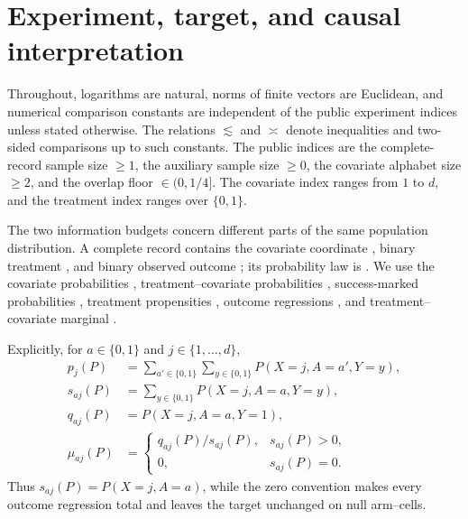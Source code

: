 \documentclass[11pt]{article}
\begin{document}
\section{Experiment, target, and causal interpretation}

Throughout, logarithms are natural, norms of finite vectors are Euclidean, and numerical comparison constants are independent of the public experiment indices unless stated otherwise. The relations \(\lesssim\) and \(\asymp\) denote inequalities and two-sided comparisons up to such constants. The public indices are the complete-record sample size \(\ge1\), the auxiliary sample size \(\ge0\), the covariate alphabet size \(\ge2\), and the overlap floor \(\in(0,1/4]\). The covariate index  ranges from \(1\) to \(d\), and the treatment index  ranges over \(\{0,1\}\).

The two information budgets concern different parts of the same population distribution. A complete record contains the covariate coordinate , binary treatment , and binary observed outcome ; its probability law is . We use the covariate probabilities , treatment--covariate probabilities , success-marked probabilities , treatment propensities , outcome regressions , and treatment--covariate marginal .

Explicitly, for \(a\in\{0,1\}\) and \(j\in\{1,\ldots,d\}\),
\[
\begin{aligned}
p_j(P)&=\sum_{a'\in\{0,1\}}\sum_{y\in\{0,1\}}P(X=j,A=a',Y=y),\\
s_{aj}(P)&=\sum_{y\in\{0,1\}}P(X=j,A=a,Y=y),\\
q_{aj}(P)&=P(X=j,A=a,Y=1),\\
\mu_{aj}(P)&=
\begin{cases}
q_{aj}(P)/s_{aj}(P),&s_{aj}(P)>0,\\
0,&s_{aj}(P)=0.
\end{cases}
\end{aligned}
\]
Thus \(s_{aj}(P)=P(X=j,A=a)\), while the zero convention makes every outcome regression total and leaves the target unchanged on null arm--cells.
\end{document}
